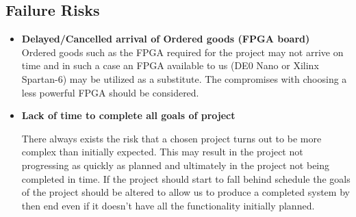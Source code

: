 \subsection{Failure Risks}

\begin{itemize}
	\item \textbf{Delayed/Cancelled arrival of Ordered goods (FPGA board)}\\
	
	Ordered goods such as the FPGA required for the project may not arrive on time and in such a case an FPGA available to us (DE0 Nano or Xilinx Spartan-6) may be utilized as a substitute. The compromises with choosing a less powerful FPGA should be considered.
	
	\item \textbf{Lack of time to complete all goals of project}
	
	There always exists the risk that a chosen project turns out to be more complex than initially expected. This may result in the project not progressing as quickly as planned and ultimately in the project not being completed in time. If the project should start to fall behind schedule the goals of the project should be altered to allow us to produce a completed system by then end even if it doesn't have all the functionality initially planned.

\end{itemize}